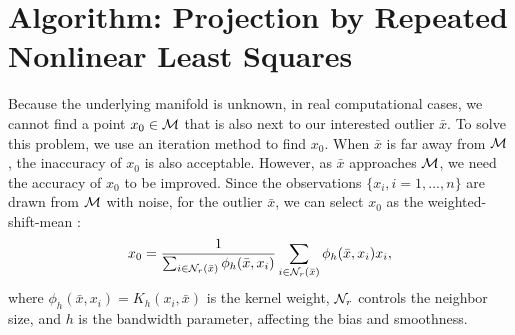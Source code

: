 \documentclass{article}
\theoremstyle{remark}
\begin{document}
\section{Algorithm: Projection by Repeated Nonlinear Least Squares}\label{nonlinear projection}
Because the underlying manifold is unknown, in real computational cases,  we cannot find a point $x_0\in \cal M$ that is also next to our interested outlier $\bar{x}$. To solve this problem, we use an iteration method to find $x_0$. When $\bar{x}$ is far away from $\cal M$, the inaccuracy of $x_0$ is also acceptable. However, as $\bar{x}$ approaches $\cal M$, we need the accuracy of  $x_0$ to be improved.
Since the observations $\{x_i, i=1,...,n\}$ are drawn from $\cal M$ with noise, for the outlier $\bar{x}$, we can select $x_0$ as the weighted-shift-mean \cite{comaniciu1999mean}:
\begin{equation}\label{weighted_mean}
x_0 =\frac{1}{\sum_{i\in {\cal N}_r(\bar{x}) } \phi_h(\bar{x},x_i)} \sum_{i\in {\cal N}_r (\bar{x})} \phi_h(\bar{x},x_i)x_i,
\end{equation}
where $\phi_h(\bar{x},x_i) = K_h(x_i, \bar{x})$ is the kernel weight, ${\cal N}_r$ controls the neighbor size, and $h$ is the bandwidth parameter, affecting the bias and smoothness.
\end{document}

